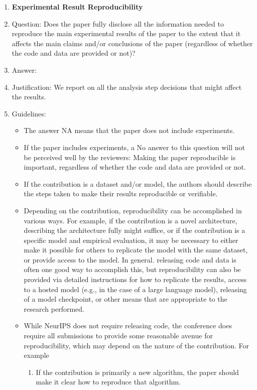 \documentclass{article} %
\newcounter{ct}
\theoremstyle{definition}
\theoremstyle{remark}
\begin{document}
\begin{enumerate}
    \item {\bf Experimental Result Reproducibility}
    \item[] Question: Does the paper fully disclose all the information needed to reproduce the main experimental results of the paper to the extent that it affects the main claims and/or conclusions of the paper (regardless of whether the code and data are provided or not)?
    \item[] Answer: \answerYes{} %
    \item[] Justification: We report on all the analysis step decisions that might affect the results.
    \item[] Guidelines:
    \begin{itemize}
        \item The answer NA means that the paper does not include experiments.
        \item If the paper includes experiments, a No answer to this question will not be perceived well by the reviewers: Making the paper reproducible is important, regardless of whether the code and data are provided or not.
        \item If the contribution is a dataset and/or model, the authors should describe the steps taken to make their results reproducible or verifiable. 
        \item Depending on the contribution, reproducibility can be accomplished in various ways. For example, if the contribution is a novel architecture, describing the architecture fully might suffice, or if the contribution is a specific model and empirical evaluation, it may be necessary to either make it possible for others to replicate the model with the same dataset, or provide access to the model. In general. releasing code and data is often one good way to accomplish this, but reproducibility can also be provided via detailed instructions for how to replicate the results, access to a hosted model (e.g., in the case of a large language model), releasing of a model checkpoint, or other means that are appropriate to the research performed.
        \item While NeurIPS does not require releasing code, the conference does require all submissions to provide some reasonable avenue for reproducibility, which may depend on the nature of the contribution. For example
        \begin{enumerate}
            \item If the contribution is primarily a new algorithm, the paper should make it clear how to reproduce that algorithm.

\end{enumerate}
\end{itemize}
\end{enumerate}
\end{document}
